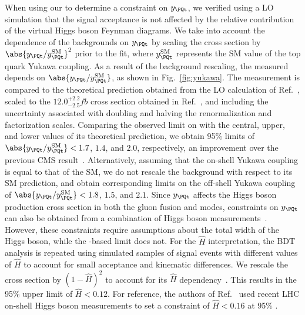 When using our \tttt to determine a constraint on $y_{\PQt}$, we verified
using a LO simulation that the signal acceptance is not affected by the
relative contribution of the virtual Higgs boson Feynman diagrams. We take
into account the dependence of the backgrounds on $y_{\PQt}$ by scaling the
\ttH cross section by $\abs{y_{\PQt}/y_{\PQt}^{\mathrm{SM}}}^2$ prior to the
fit, where $y_{\PQt}^{\mathrm{SM}}$ represents the SM value of the top quark
Yukawa coupling. As a result of the \ttH background rescaling, the measured
\xsectttt depends on $\abs{y_{\PQt}/y_{\PQt}^{\mathrm{SM}}}$, as shown in
Fig.~\ref{fig:yukawa}. The measurement is compared to the theoretical
prediction obtained from the LO calculation of Ref.~\cite{THEORY:TopYukawaTTTT},
scaled to the $12.0^{+2.2}_{-2.5}\unit{fb}$ cross section obtained in
Ref.~\cite{THEORY:Frederix2017wme}, and including the uncertainty associated with
doubling and halving the renormalization and factorization scales. Comparing
the observed limit on \xsectttt with the central, upper, and lower values of
its theoretical prediction, we obtain 95\% \CL limits of
$\abs{y_{\PQt}/y_{\PQt}^{\mathrm{SM}}} < 1.7$, $1.4$, and $2.0$,
respectively, an improvement over the previous CMS
result~\cite{CMS:myTOP2016}. Alternatively, assuming that the on-shell Yukawa
coupling is equal to that of the SM, we do not rescale the \ttH background
with respect to its SM prediction, and obtain corresponding limits on the
off-shell Yukawa coupling of $\abs{y_{\PQt}/y_{\PQt}^{\mathrm{SM}}} < 1.8$,
$1.5$, and $2.1$. Since $y_{\PQt}$ affects the Higgs boson production cross
section in both the gluon fusion and \ttH modes, constraints on $y_{\PQt}$
can also be obtained from a combination of Higgs boson
measurements~\cite{STAT:AtlasCmsHiggsComb}. However, these constraints require
assumptions about the total width of the Higgs boson, while the \tttt-based
limit does not. For the $\hat{H}$ interpretation, the BDT analysis is
repeated using simulated samples of \tttt signal events with different values
of $\hat{H}$ to account for small acceptance and kinematic differences. 
We rescale the \ttH cross section by
$(1-\hat{H})^2$ to account for its $\hat{H}$
dependency~\cite{THEORY:ObliqueHiggs2019}. This results in the 95\% \CL upper limit
of $\hat{H} < 0.12$. For reference, the authors of
Ref.~\cite{THEORY:ObliqueHiggs2019} used recent LHC on-shell Higgs boson
measurements to set a constraint of $\hat{H} < 0.16$ at 95\% \CL.


